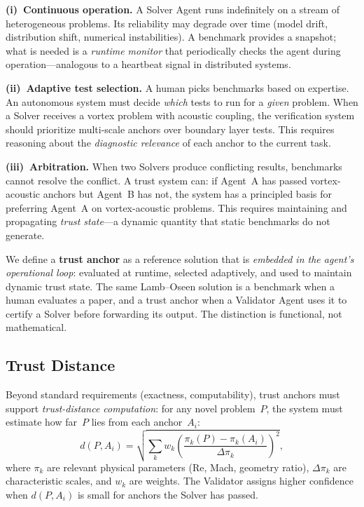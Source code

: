 \documentclass[conference]{IEEEtran}
\begin{document}
\textbf{(i)~Continuous operation.} A Solver Agent runs indefinitely on a stream of heterogeneous problems. Its reliability may degrade over time (model drift, distribution shift, numerical instabilities). A benchmark provides a snapshot; what is needed is a \emph{runtime monitor} that periodically checks the agent during operation---analogous to a heartbeat signal in distributed systems.

\textbf{(ii)~Adaptive test selection.} A human picks benchmarks based on expertise. An autonomous system must decide \emph{which} tests to run for a \emph{given} problem. When a Solver receives a vortex problem with acoustic coupling, the verification system should prioritize multi-scale anchors over boundary layer tests. This requires reasoning about the \emph{diagnostic relevance} of each anchor to the current task.

\textbf{(iii)~Arbitration.} When two Solvers produce conflicting results, benchmarks cannot resolve the conflict. A trust system can: if Agent~A has passed vortex-acoustic anchors but Agent~B has not, the system has a principled basis for preferring Agent~A on vortex-acoustic problems. This requires maintaining and propagating \emph{trust state}---a dynamic quantity that static benchmarks do not generate.

We define a \textbf{trust anchor} as a reference solution that is \emph{embedded in the agent's operational loop}: evaluated at runtime, selected adaptively, and used to maintain dynamic trust state. The same Lamb--Oseen solution is a benchmark when a human evaluates a paper, and a trust anchor when a Validator Agent uses it to certify a Solver before forwarding its output. The distinction is functional, not mathematical.

\subsection{Trust Distance}

Beyond standard requirements (exactness, computability), trust anchors must support \emph{trust-distance computation}: for any novel problem~$P$, the system must estimate how far~$P$ lies from each anchor~$A_i$:
\begin{equation}\label{eq:trust-distance}
  d(P, A_i) = \sqrt{\sum_k w_k \left(\frac{\pi_k(P) - \pi_k(A_i)}{\Delta\pi_k}\right)^2},
\end{equation}
where $\pi_k$ are relevant physical parameters (Re, Mach, geometry ratio), $\Delta\pi_k$ are characteristic scales, and $w_k$ are weights. The Validator assigns higher confidence when $d(P, A_i)$ is small for anchors the Solver has passed.
\end{document}

